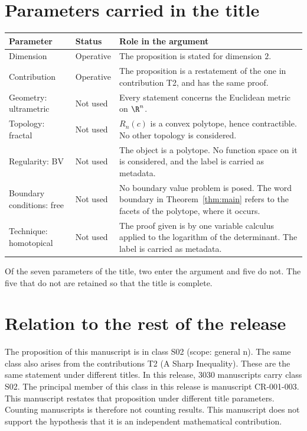 \documentclass[11pt]{article}
\begin{document}
\section{Parameters carried in the title}\label{sec:params}
\begin{center}
\small
\begin{tabular}{p{}p{}p{}}
\toprule
Parameter & Status & Role in the argument \\
\midrule
Dimension & Operative & The proposition is stated for dimension $2$. \\
Contribution & Operative & The proposition is a restatement of the one in contribution T2, and has the same proof. \\
Geometry: ultrametric & Not used & Every statement concerns the Euclidean metric on $\R^n$. \\
Topology: fractal & Not used & $R_n(c)$ is a convex polytope, hence contractible. No other topology is considered. \\
Regularity: BV & Not used & The object is a polytope. No function space on it is considered, and the label is carried as metadata. \\
Boundary conditions: free & Not used & No boundary value problem is posed. The word boundary in Theorem~\ref{thm:main} refers to the facets of the polytope, where it occurs. \\
Technique: homotopical & Not used & The proof given is by one variable calculus applied to the logarithm of the determinant. The label is carried as metadata. \\
\bottomrule
\end{tabular}
\end{center}
Of the seven parameters of the title, two enter the argument and five do not. The five that do not are retained so that the title is complete.

\section{Relation to the rest of the release}
The proposition of this manuscript is in class S02 (scope: general n). The same class also arises from the contributions T2 (A Sharp Inequality). These are the same statement under different titles.
In this release, 3030 manuscripts carry class S02. The principal member of this class in this release is manuscript CR-001-003. This manuscript restates that proposition under different title parameters.
Counting manuscripts is therefore not counting results. This manuscript does not support the hypothesis that it is an independent mathematical contribution.
\end{document}
